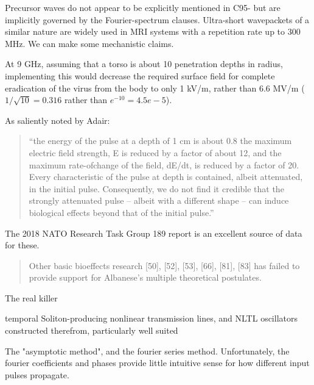 \documentclass[paper.tex]{subfiles}
\begin{document}
Precursor waves do not appear to be explicitly mentioned in C95- but are implicitly governed by the Fourier-spectrum clauses. Ultra-short wavepackets of a similar nature are widely used in MRI systems with a repetition rate up to 300 MHz. We can make some mechanistic claims.

At 9 GHz, assuming that a torso is about 10 penetration depths in radius, implementing this would decrease the required surface field for complete eradication of the virus from the body to only 1 kV/m, rather than 6.6 MV/m ($1/\sqrt{10}=0.316$ rather than $e^{-10}=4.5e-5$). 


As saliently noted by Adair:

\begin{quote}
	“the energy of the pulse at a depth of 1 cm is about 0.8%
	the maximum electric field strength, E is reduced by a factor of about 12, and the maximum rate-ofchange of the field, dE/dt, is reduced by a factor of 20. Every characteristic of the pulse at depth is
	contained, albeit attenuated, in the initial pulse. Consequently, we do not find it credible that the
	strongly attenuated pulse – albeit with a different shape – can induce biological effects beyond that of
	the initial pulse.”
\end{quote}


The 2018 NATO Research Task Group 189 report \cite{treatyelectromagnetic} is an excellent source of data for these. 

\begin{quote}
	Other basic bioeffects research [50], [52], [53], [66], [81], [83] has failed to provide support for Albanese’s multiple	theoretical postulates.
\end{quote}

The real killer 





temporal Soliton-producing nonlinear transmission lines, and NLTL oscillators constructed therefrom, particularly well suited 




\footnotemark


\footnotemark
{}



The "asymptotic method", and the fourier series method. Unfortunately, the fourier coefficients and phases provide little intuitive sense for how different input pulses propagate. 

\end{document}
